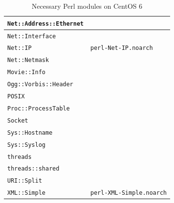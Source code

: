 \documentclass[a4paper,oneside,10pt]{report}
\begin{document}
\begin{table}
\begin{tabular}{|p{15em}|p{17em}|}
		\hline
		\verb|Net::Address::Ethernet| 		& \\
		\hline
		\verb|Net::Interface| 						&	\\
		\hline
		\verb|Net::IP| 										& \verb|perl-Net-IP.noarch| \\
		\hline
		\verb|Net::Netmask| 							& \\
		\hline
		\verb|Movie::Info| 								& \\
		\hline
		\verb|Ogg::Vorbis::Header| 				& \\
		\hline
		\verb|POSIX| 											& \\
		\hline
		\verb|Proc::ProcessTable| 				& \\
		\hline
		\verb|Socket| 										& \\
		\hline
		\verb|Sys::Hostname| 							& \\
		\hline
		\verb|Sys::Syslog| 								& \\
		\hline
		\verb|threads| 										& \\
		\hline
		\verb|threads::shared| 						& \\
		\hline
		\verb|URI::Split| 								& \\
		\hline
		\verb|XML::Simple| 								& \verb|perl-XML-Simple.noarch| \\
		\hline
	\end{tabular}
	\caption{Necessary Perl modules on CentOS 6}
	\label{tab:NecessaryPerlModulesCentOS6}
\end{table}
\end{document}
